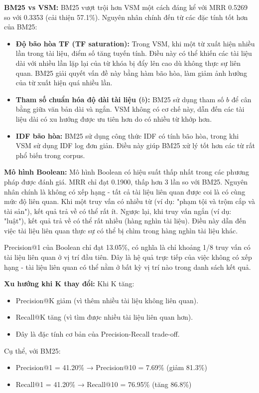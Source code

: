 \documentclass[../BTL.tex]{subfiles}
\begin{document}
\textbf{BM25 vs VSM:}
BM25 vượt trội hơn VSM một cách đáng kể với MRR 0.5269 so với 0.3353 (cải thiện 57.1\%). Nguyên nhân chính đến từ các đặc tính tốt hơn của BM25:
\begin{itemize}
    \item \textbf{Độ bão hòa TF (TF saturation):} Trong VSM, khi một từ xuất hiện nhiều lần trong tài liệu, điểm số tăng tuyến tính. Điều này có thể khiến các tài liệu dài với nhiều lần lặp lại của từ khóa bị đẩy lên cao dù không thực sự liên quan. BM25 giải quyết vấn đề này bằng hàm bão hòa, làm giảm ảnh hưởng của từ xuất hiện quá nhiều lần.
    \item \textbf{Tham số chuẩn hóa độ dài tài liệu ($b$):} BM25 sử dụng tham số $b$ để cân bằng giữa văn bản dài và ngắn. VSM không có cơ chế này, dẫn đến các tài liệu dài có xu hướng được ưu tiên hơn do có nhiều từ khớp hơn.
    \item \textbf{IDF bão hòa:} BM25 sử dụng công thức IDF có tính bão hòa, trong khi VSM sử dụng IDF log đơn giản. Điều này giúp BM25 xử lý tốt hơn các từ rất phổ biến trong corpus.
\end{itemize}

\textbf{Mô hình Boolean:}
Mô hình Boolean có hiệu suất thấp nhất trong các phương pháp được đánh giá. MRR chỉ đạt 0.1900, thấp hơn 3 lần so với BM25. Nguyên nhân chính là không có xếp hạng - tất cả tài liệu liên quan được coi là có cùng mức độ liên quan. Khi một truy vấn có nhiều từ (ví dụ: "phạm tội và trộm cắp và tài sản"), kết quả trả về có thể rất ít. Ngược lại, khi truy vấn ngắn (ví dụ: "luật"), kết quả trả về có thể rất nhiều (hàng nghìn tài liệu). Điều này dẫn đến việc tài liệu liên quan thực sự có thể bị chìm trong hàng nghìn tài liệu khác.

Precision@1 của Boolean chỉ đạt 13.05\%, có nghĩa là chỉ khoảng 1/8 truy vấn có tài liệu liên quan ở vị trí đầu tiên. Đây là hệ quả trực tiếp của việc không có xếp hạng - tài liệu liên quan có thể nằm ở bất kỳ vị trí nào trong danh sách kết quả.

\textbf{Xu hướng khi K thay đổi:}
Khi K tăng:
\begin{itemize}
    \item Precision@K giảm (vì thêm nhiều tài liệu không liên quan).
    \item Recall@K tăng (vì tìm được nhiều tài liệu liên quan hơn).
    \item Đây là đặc tính cơ bản của Precision-Recall trade-off.
\end{itemize}

Cụ thể, với BM25:
\begin{itemize}
    \item Precision@1 = 41.20\% → Precision@10 = 7.69\% (giảm 81.3\%)
    \item Recall@1 = 41.20\% → Recall@10 = 76.95\% (tăng 86.8\%)
\end{itemize}
\end{document}
